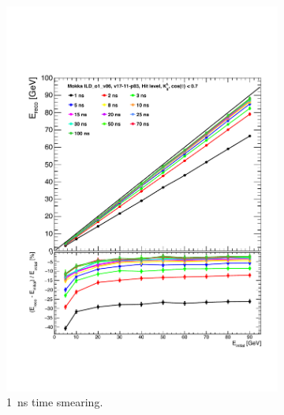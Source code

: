 \begin{figure}[t]
\begin{minipage}{1\textwidth}
\begin{subfigure}[t]{0.5\textwidth}
      \includegraphics[width=1\linewidth]{chap6/fig_TimingILD/1ns_Smearing/Linearity_TimeCuts_Smearing1ns}
      \vspace{-6ex}
      \caption{\SI{1}{\nano\second} time smearing.} \label{fig:Lin1ns}
    \end{subfigure}
  \end{minipage}
  \begin{subfigure}[t]{0.5\textwidth}
    \centering

\end{subfigure}
\end{figure}
